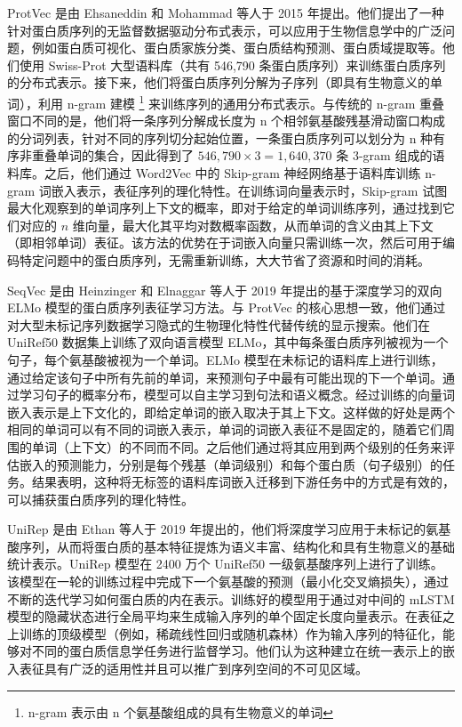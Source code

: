 ProtVec \cite{asgari2015continuous} 是由 Ehsaneddin 和 Mohammad 等人于 2015 年提出。他们提出了一种针对蛋白质序列的无监督数据驱动分布式表示，可以应用于生物信息学中的广泛问题，例如蛋白质可视化、蛋白质家族分类、蛋白质结构预测、蛋白质域提取等。他们使用 Swiss-Prot 大型语料库（共有 546,790 条蛋白质序列）来训练蛋白质序列的分布式表示。接下来，他们将蛋白质序列分解为子序列（即具有生物意义的单词），利用 n-gram 建模 \footnote{n-gram 表示由 n 个氨基酸组成的具有生物意义的单词} 来训练序列的通用分布式表示。与传统的 n-gram 重叠窗口不同的是，他们将一条序列分解成长度为 n 个相邻氨基酸残基滑动窗口构成的分词列表，针对不同的序列切分起始位置，一条蛋白质序列可以划分为 n 种有序非重叠单词的集合，因此得到了 $546,790 \times 3 = 1,640,370$ 条 3-gram 组成的语料库。之后，他们通过 Word2Vec \cite{mikolov2013distributed} 中的 Skip-gram 神经网络基于语料库训练 n-gram 词嵌入表示，表征序列的理化特性。在训练词向量表示时，Skip-gram 试图最大化观察到的单词序列上下文的概率，即对于给定的单词训练序列，通过找到它们对应的 $n$ 维向量，最大化其平均对数概率函数，从而单词的含义由其上下文（即相邻单词）表征。该方法的优势在于词嵌入向量只需训练一次，然后可用于编码特定问题中的蛋白质序列，无需重新训练，大大节省了资源和时间的消耗。

SeqVec \cite{heinzinger2019modeling} 是由 Heinzinger 和 Elnaggar 等人于 2019 年提出的基于深度学习的双向 ELMo \cite{peters1802deep} 模型的蛋白质序列表征学习方法。与 ProtVec 的核心思想一致，他们通过对大型未标记序列数据学习隐式的生物理化特性代替传统的显示搜索。他们在 UniRef50 数据集上训练了双向语言模型 ELMo，其中每条蛋白质序列被视为一个句子，每个氨基酸被视为一个单词。ELMo 模型在未标记的语料库上进行训练，通过给定该句子中所有先前的单词，来预测句子中最有可能出现的下一个单词。通过学习句子的概率分布，模型可以自主学习到句法和语义概念。经过训练的向量词嵌入表示是上下文化的，即给定单词的嵌入取决于其上下文。这样做的好处是两个相同的单词可以有不同的词嵌入表示，单词的词嵌入表征不是固定的，随着它们周围的单词（上下文）的不同而不同。之后他们通过将其应用到两个级别的任务来评估嵌入的预测能力，分别是每个残基（单词级别）和每个蛋白质（句子级别）的任务。结果表明，这种将无标签的语料库词嵌入迁移到下游任务中的方式是有效的，可以捕获蛋白质序列的理化特性。

UniRep \cite{alley2019unified} 是由 Ethan 等人于 2019 年提出的，他们将深度学习应用于未标记的氨基酸序列，从而将蛋白质的基本特征提炼为语义丰富、结构化和具有生物意义的基础统计表示。UniRep 模型在 2400 万个 UniRef50 一级氨基酸序列上进行了训练。该模型在一轮的训练过程中完成下一个氨基酸的预测（最小化交叉熵损失），通过不断的迭代学习如何蛋白质的内在表示。训练好的模型用于通过对中间的 mLSTM 模型的隐藏状态进行全局平均来生成输入序列的单个固定长度向量表示。在表征之上训练的顶级模型（例如，稀疏线性回归或随机森林）作为输入序列的特征化，能够对不同的蛋白质信息学任务进行监督学习。他们认为这种建立在统一表示上的嵌入表征具有广泛的适用性并且可以推广到序列空间的不可见区域。

